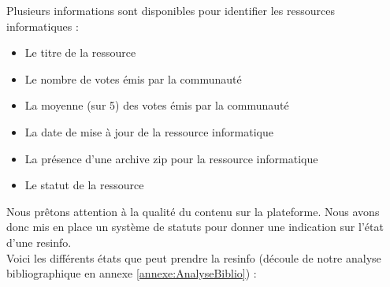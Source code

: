 Plusieurs informations sont disponibles pour identifier les ressources informatiques :

\begin{itemize}
    \item Le titre de la ressource
    \item Le nombre de votes émis par la communauté
    \item La moyenne (sur 5) des votes émis par la communauté
    \item La date de mise à jour de la ressource informatique
    \item La présence d'une archive zip pour la ressource informatique
    \item Le statut de la ressource
\end{itemize}


\label{section:statutDuneRessource}

Nous prêtons attention à la qualité du contenu sur la plateforme. Nous avons donc mis en place un système de statuts pour donner une indication sur l'état d'une \gls{resinfo}.\\

Voici les différents états que peut prendre la \gls{resinfo} (découle de notre analyse bibliographique en annexe \ref{annexe:AnalyseBiblio}) :

